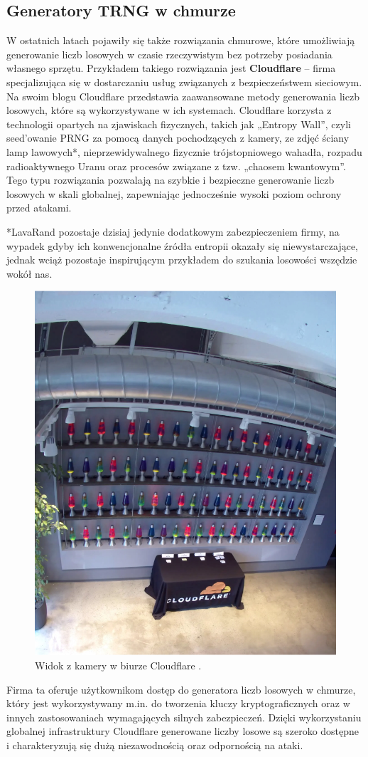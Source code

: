 \subsection{Generatory TRNG w chmurze}

W ostatnich latach pojawiły się także rozwiązania chmurowe, które umożliwiają generowanie liczb losowych w czasie rzeczywistym bez potrzeby posiadania własnego sprzętu. Przykładem takiego rozwiązania jest \textbf{Cloudflare} – firma specjalizująca się w dostarczaniu usług związanych z bezpieczeństwem sieciowym. Na swoim blogu Cloudflare przedstawia zaawansowane metody generowania liczb losowych, które są wykorzystywane w ich systemach.
Cloudflare korzysta z technologii opartych na zjawiskach fizycznych, takich jak „Entropy Wall”, czyli seed'owanie PRNG za pomocą danych pochodzących z kamery, ze zdjęć ściany lamp lawowych*,
nieprzewidywalnego fizycznie trójstopniowego wahadła, rozpadu radioaktywnego Uranu oraz procesów związane z tzw. „chaosem kwantowym”.
Tego typu rozwiązania pozwalają na szybkie i bezpieczne generowanie liczb losowych w skali globalnej, zapewniając jednocześnie wysoki poziom ochrony przed atakami.

*LavaRand pozostaje dzisiaj jedynie dodatkowym zabezpieczeniem firmy, na wypadek gdyby ich konwencjonalne źródła entropii okazały się niewystarczające, jednak wciąż pozostaje inspirującym przykładem do szukania losowości wszędzie wokół nas.

\begin{figure}[H]
    \centering
    \includegraphics[width=0.4\linewidth]{chapters/02-teoria/figures/lavarandCamera}
    \caption{Widok z kamery w biurze Cloudflare \cite{cloudflare_lavarand}.}
    \label{fig:lavarand}
\end{figure}


Firma ta oferuje użytkownikom dostęp do generatora liczb losowych w chmurze, który jest wykorzystywany
m.in. do tworzenia kluczy kryptograficznych oraz w innych zastosowaniach wymagających silnych zabezpieczeń.
Dzięki wykorzystaniu globalnej infrastruktury Cloudflare generowane liczby losowe są
szeroko dostępne i charakteryzują się dużą niezawodnością oraz odpornością na ataki.


